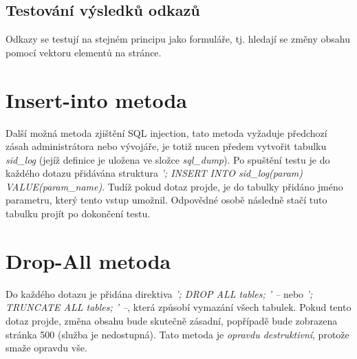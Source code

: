 \subsection{Testování výsledků odkazů}
Odkazy se testují na stejném principu jako formuláře, tj. hledají se změny obsahu pomocí vektoru elementů na stránce.

\section{Insert-into metoda}
Další možná metoda zjištění SQL injection, tato metoda vyžaduje předchozí zásah administrátora nebo vývojáře, je totiž nucen předem vytvořit tabulku \textit{sid\_log} (jejíž definice je uložena ve složce \textit{sql\_dump}). Po spuštění testu je do každého dotazu přidávána struktura \textit{'; INSERT INTO sid\_log(param) VALUE(param\_name)}. Tudíž pokud dotaz projde, je do tabulky přidáno jméno parametru, který tento vstup umožnil. Odpovědné osobě následně stačí tuto tabulku projít po dokončení testu.

\section{Drop-All metoda}
Do každého dotazu je přidána direktiva \textit{'; DROP ALL tables; ' --} nebo \textit{'; TRUNCATE ALL tables; ' --}, která způsobí vymazání všech tabulek. Pokud tento dotaz projde, změna obsahu bude skutečně zásadní, popřípadě bude zobrazena stránka 500 (služba je nedostupná). Tato metoda je \textit{opravdu destruktivní}, protože smaže opravdu vše.
